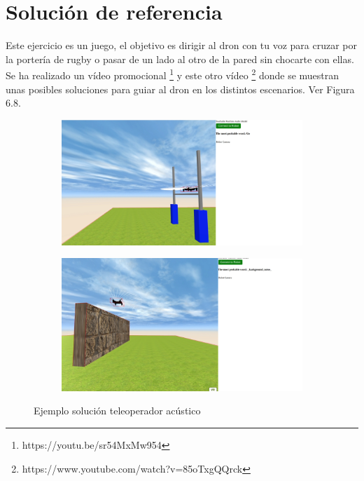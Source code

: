 \section{Solución de referencia}

Este ejercicio es un juego, el objetivo es dirigir al dron con tu voz para cruzar por la portería de rugby o pasar de un lado al otro de la pared sin chocarte con ellas. Se ha realizado un vídeo promocional \footnote{https://youtu.be/sr54MxMw954} y este otro vídeo \footnote{https://www.youtube.com/watch?v=85oTxgQQrck} donde se muestran unas posibles soluciones para guiar al dron en los distintos escenarios. Ver Figura 6.8.

 \begin{figure}[H]
  \begin{subfigure}[b]{0.5\textwidth}
  \centering
    \includegraphics[width=1\textwidth, height=0.7\textwidth]{chapters/images/solucionaudio.png}
    \caption{}
    \label{fig:f1}
  \end{subfigure}
  \hfill
  \begin{subfigure}[b]{0.5\textwidth}
  \centering
    \includegraphics[width=1\textwidth, height=0.7\textwidth]{chapters/images/solucionaudio2.png}
	\caption{}    
    \label{fig:f2}
 
  \end{subfigure}
  \caption{Ejemplo solución teleoperador acústico}
\end{figure}


